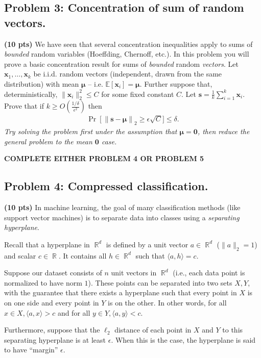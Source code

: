 \documentclass[10pt]{article}
\DeclareMathOperator{\R}{\mathbb{R}}
\newcommand{\E}{\mathbb{E}}
\newcommand{\bs}[1]{\boldsymbol{#1}}
\newcommand{\bv}[1]{\mathbf{#1}}
\begin{document}
\subsection{Problem 3: Concentration of sum of random vectors.}
\textbf{(10 pts)} We have seen that several concentration inequalities apply to sums of \emph{bounded} random variables (Hoeffding, Chernoff, etc.). In this problem you will prove a basic concentration result for sums of \emph{bounded} random \emph{vectors}.
Let $\bv{x}_1, \ldots, \bv{x}_k$ be i.i.d. random vectors (independent, drawn from the same distribution) with mean $\bs{\mu}$ -- i.e. $\E[\bv{x}_i] = \bv{\mu}$. Further suppose that, deterministically, $\|\bv{x}_i\|_2^2 \leq C$ for some fixed constant $C$.  Let $\bv{s} = \frac{1}{k}\sum_{i=1}^k\bv{x}_i$. Prove that if $k \geq O(\frac{1/\delta}{\epsilon^2})$ then
\begin{align*}
	\Pr\left[\|\bv{s} - \bs{\mu}\right\|_2 \geq \epsilon \sqrt{C}] \leq \delta.
\end{align*}
\emph{Try solving the problem first under the assumption that $\bs{\mu} = \bv{0}$, then reduce the general problem to the mean $\bv{0}$ case.}

\begin{center}
\textbf{COMPLETE EITHER PROBLEM 4 OR PROBLEM 5}
\end{center}

\subsection{Problem 4: Compressed classification.}
\textbf{(10 pts)} In machine learning, the goal of many classification methods (like support vector machines) is to separate data into classes using a \emph{separating hyperplane}.

Recall that a hyperplane in $\R^d$ is defined by a unit vector $a \in \R^d$ ($\|a\|_2 = 1$) and scalar $c \in \R$. It contains all  $h \in \R^d$ such that $\langle a, h\rangle = c$. 

Suppose our dataset consists of $n$ unit vectors in $\R^d$ (i.e., each data point is normalized to have norm $1$). These points can be separated into two sets $X, Y$,
with the guarantee that there exists a hyperplane such that every point in $X$ is on one side and every point in 
$Y$ is on the other. In other words, for all $x\in X, \langle a, x\rangle > c$ and for all $y\in Y, \langle a, y\rangle < c$.

Furthermore, suppose that the $\ell_2$ distance of each point in $X$ and $Y$ to this separating hyperplane is at least $\epsilon$. When this is the case, the hyperplane is said to have ``margin'' $\epsilon$. 
\end{document}

